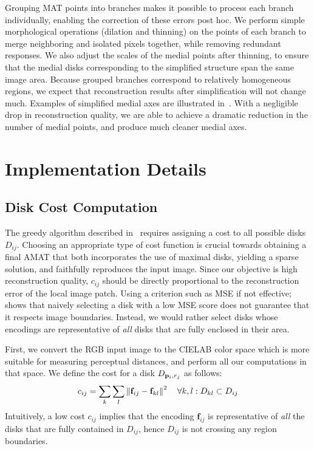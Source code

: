 \documentclass[10pt,twocolumn,letterpaper]{article}
\begin{document}
Grouping MAT points into branches makes it possible to process each branch individually, enabling
the correction of these errors post hoc.
We perform simple morphological operations (dilation and thinning) 
on the points of each branch to merge neighboring and isolated pixels together, while removing 
redundant responses. 
We also adjust the scales of the medial points after thinning, to ensure that the medial disks corresponding 
to the simplified structure span the same image area.
Because grouped branches correspond to relatively homogeneous regions, we expect that reconstruction
results after simplification will not change much.
Examples of simplified medial axes are illustrated in~.
With a negligible drop in reconstruction quality, we are able to achieve a dramatic reduction
in the number of medial points, and produce much cleaner medial axes.


\section{Implementation Details}\label{sec:implementation}
\subsection{Disk Cost Computation}\label{sec:implementation:diskcost}
The greedy algorithm described in~ requires assigning a cost to all possible disks $D_{ij}$.
Choosing an appropriate type of cost function is crucial towards obtaining a final AMAT that both incorporates
the use of maximal disks, yielding a sparse solution, and faithfully reproduces the input image.
Since our objective is high reconstruction quality, $c_{ij}$ should be directly proportional
to the reconstruction error of the local image patch.
Using a criterion such as MSE if not effective;~ shows that naively selecting a disk with 
a low MSE score does not guarantee that it respects image boundaries.
Instead, we would rather select disks whose encodings are representative of \emph{all} disks that are fully enclosed
in their area. 

First, we convert the RGB input image to the CIELAB color space which is more suitable for measuring perceptual distances,
and perform all our computations in that space.
We define the cost for a disk $D_{\mathbf{p}_{i},r_j}$ as follows:
\begin{equation}
c_{ij} = \sum_k \sum_l \left \lVert \mathbf{f}_{ij} - \mathbf{f}_{kl}  \right \rVert^2 \quad \forall k,l: D_{kl} \subset D_{ij}
\label{eq:diskcost}
\end{equation}
Intuitively, a low cost $c_{ij}$ implies that the encoding $\mathbf{f}_{ij}$ is representative of \emph{all}
the disks that are fully contained in $D_{ij}$, hence $D_{ij}$ is not crossing any region boundaries.
\end{document}
